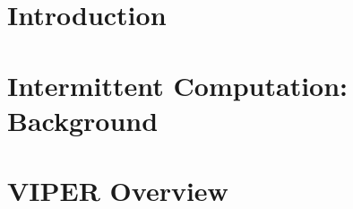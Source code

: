 \documentclass[pageno]{jpaper}
\newcommand{\sys}{VIPER\xspace}
\begin{document}



\section{Introduction}
\label{sec:intro}



\section{Intermittent Computation: Background}
\label{sec:background}



\section{\sys Overview}
\label{sec:overeall_system}
\end{document}
